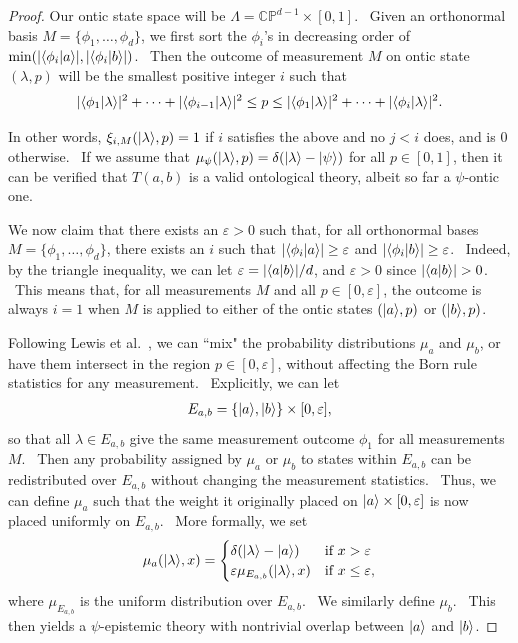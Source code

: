 \documentclass[letterpaper,12pt]{article}
\newcommand{\ba}{\begin{eqnarray}}
\newcommand{\ea}{\end{eqnarray}}
\newcommand{\braket}[2]{\mbox{$ \langle #1 | #2 \rangle $}}
\newcommand{\ket}[1]{\mbox{$ | #1 \rangle $}}
\begin{document}
\begin{proof}
Our ontic state space will be $\Lambda=\mathbb{CP}^{d-1}\times [0,1]$. \ Given an orthonormal basis $M=\{\phi_1,\ldots,\phi_d\}$, we first sort the $\phi_i$'s in decreasing order of $\min(|\braket{\phi_i}{a}|,|\braket{\phi_i}{b}|)$. \ Then the outcome of measurement $M$ on ontic state $(\lambda,p)$ will be the smallest positive integer $i$ such that
\ba |\braket{\phi_1}{\lambda}|^2+\cdots+|\braket{\phi_{i-1}}{\lambda}|^2\leq p \leq |\braket{\phi_1}{\lambda}|^2+\cdots+|\braket{\phi_i}{\lambda}|^2. \ea

\noindent In other words, $\xi_{i,M}(\ket{\lambda},p)=1$ if $i$ satisfies the above and no $j<i$ does, and is $0$ otherwise. \ If we assume that $\mu_{\psi}(\ket{\lambda},p)=\delta(\ket{\lambda}-\ket{\psi})$ for all $p\in[0,1]$, then it can be verified that $T(a,b)$ is a valid ontological theory, albeit so far a $\psi$-ontic one.

We now claim that there exists an $\varepsilon>0$ such that, for all orthonormal bases $M=\{\phi_1,\ldots,\phi_d\}$, there exists an $i$ such that $|\braket{\phi_i}{a}|\geq\varepsilon$ and $|\braket{\phi_i}{b}|\geq\varepsilon$. \ Indeed, by the triangle inequality, we can let $\varepsilon=|\braket{a}{b}|/d$, and $\varepsilon >0$ since $|\braket{a}{b}|>0$. \ This means that, for all measurements $M$ and all $p\in[0,\varepsilon]$, the outcome is always $i=1$ when $M$ is applied to either of the ontic states $(\ket{a},p)$ or $(\ket{b},p)$.

Following Lewis et al.\ \cite{lewis}, we can ``mix" the probability distributions $\mu_a$ and $\mu_b$, or have them intersect in the region $p\in [0,\varepsilon]$, without affecting the Born rule statistics for any measurement. \ Explicitly, we can let
\ba E_{a,b} = \{\ket{a},\ket{b}\} \times [0,\varepsilon], \ea
so that all $\lambda\in E_{a,b}$ give the same measurement outcome $\phi_1$ for all measurements $M$. \ Then any probability assigned by $\mu_{a}$ or $\mu_{b}$ to states within $E_{a,b}$ can be redistributed over $E_{a,b}$ without changing the measurement statistics. \ Thus, we can define $\mu_{a}$ such that the weight it originally placed on $\ket{a} \times [0,\varepsilon]$ is now placed uniformly on $E_{a,b}$. \ More formally, we set
\ba \mu_{a}(\ket{\lambda},x) =
  \begin{cases}
   \delta(\ket{\lambda}-\ket{a})  & \text{if } x > \varepsilon \\
   \varepsilon\mu_{E_{a,b}}(\ket{\lambda},x)       & \text{if } x\leq \varepsilon,
  \end{cases} \ea
where $\mu_{E_{a,b}}$ is the uniform distribution over $E_{a,b}$. \ We similarly define $\mu_{b}$. \ This then yields a $\psi$-epistemic theory with nontrivial overlap between $\ket{a}$ and $\ket{b}$.


\end{proof}
\end{document}
